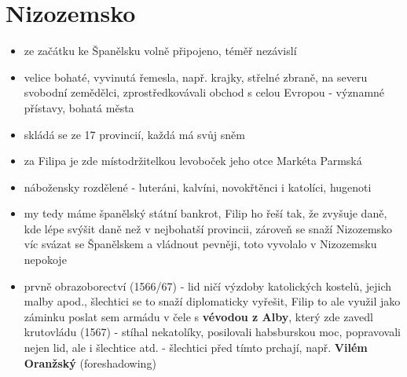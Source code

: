 \documentclass{article}
\begin{document}
\section{Nizozemsko}
\begin{itemize}
  \item ze začátku ke Španělsku volně připojeno, téměř nezávislí
  \item velice bohaté, vyvinutá řemesla, např. krajky, střelné zbraně, na severu svobodní zemědělci, zprostředkovávali obchod s celou Evropou - významné přístavy, bohatá města
  \item skládá se ze 17 provincií, každá má svůj sněm
  \item za Filipa je zde místodržitelkou levoboček jeho otce Markéta Parmská
  \item nábožensky rozdělené - luteráni, kalvíni, novokřtěnci i katolíci, hugenoti
  \item my tedy máme španělský státní bankrot, Filip ho řeší tak, že zvyšuje daně, kde lépe svýšit daně než v nejbohatší provincii, zároveň se snaží Nizozemsko víc svázat se Španělskem a vládnout pevněji, toto vyvolalo v Nizozemsku nepokoje
  \item prvně obrazoborectví (1566/67) - lid ničí výzdoby katolických kostelů, jejich malby apod., šlechtici se to snaží diplomaticky vyřešit, Filip to ale využil jako záminku poslat sem armádu v čele s \textbf{vévodou z Alby}, který zde zavedl krutovládu (1567) - stíhal nekatolíky, posilovali habsburskou moc, popravovali nejen lid, ale i šlechtice atd. - šlechtici před tímto prchají, např. \textbf{Vilém Oranžský} (foreshadowing)
\end{itemize}
\end{document}
